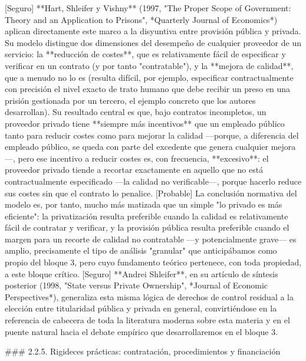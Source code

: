 \documentclass[10pt,a4paper]{article}
\begin{document}
[Seguro] **Hart, Shleifer y Vishny** (1997, "The Proper Scope of Government: Theory and an Application to Prisons", *Quarterly Journal of Economics*) aplican directamente este marco a la disyuntiva entre provisión pública y privada. Su modelo distingue dos dimensiones del desempeño de cualquier proveedor de un servicio: la **reducción de costes**, que es relativamente fácil de especificar y verificar en un contrato (y por tanto "contratable"), y la **mejora de calidad**, que a menudo no lo es (resulta difícil, por ejemplo, especificar contractualmente con precisión el nivel exacto de trato humano que debe recibir un preso en una prisión gestionada por un tercero, el ejemplo concreto que los autores desarrollan). Su resultado central es que, bajo contratos incompletos, un proveedor privado tiene **siempre más incentivos** que un empleado público tanto para reducir costes como para mejorar la calidad —porque, a diferencia del empleado público, se queda con parte del excedente que genera cualquier mejora—, pero ese incentivo a reducir costes es, con frecuencia, **excesivo**: el proveedor privado tiende a recortar exactamente en aquello que no está contractualmente especificado —la calidad no verificable—, porque hacerlo reduce sus costes sin que el contrato lo penalice. [Probable] La conclusión normativa del modelo es, por tanto, mucho más matizada que un simple "lo privado es más eficiente": la privatización resulta preferible cuando la calidad es relativamente fácil de contratar y verificar, y la provisión pública resulta preferible cuando el margen para un recorte de calidad no contratable —y potencialmente grave— es amplio, precisamente el tipo de análisis "granular" que anticipábamos como propio del bloque 3, pero cuyo fundamento teórico pertenece, con toda propiedad, a este bloque crítico. [Seguro] **Andrei Shleifer**, en su artículo de síntesis posterior (1998, "State versus Private Ownership", *Journal of Economic Perspectives*), generaliza esta misma lógica de derechos de control residual a la elección entre titularidad pública y privada en general, convirtiéndose en la referencia de cabecera de toda la literatura moderna sobre esta materia y en el puente natural hacia el debate empírico que desarrollaremos en el bloque 3.

### 2.2.5. Rigideces prácticas: contratación, procedimientos y financiación
\end{document}
